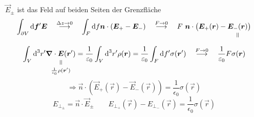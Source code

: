 $ \vec{E}_{\pm} $ ist das Feld auf beiden Seiten der Grenzfläche
\begin{equation*}
\int_{\partial V} \dd\vec{f}' \vec{E} \quad \buildrel \Delta z \to 0 \over \longrightarrow \quad \int_{F} \dd f \vec{n} \cdot (\vec{E}_+ - \vec{E}_-) \quad \buildrel F \to 0 \over \longrightarrow \quad F \ \vec{n} \cdot \big(\vec{E}_+(\vec{r}) - \equalto{\vec{E}_-(\vec{r})}{}\big)
\end{equation*}
\begin{equation*}
\int_V \dd^3r' \equalto{\vec{\nabla} \cdot \vec{E}(\vec{r}')}{\frac{1}{\epsilon_0} \rho(\vec{r}')} = \frac{1}{\epsilon_0} \int_V \dd^3r' \rho(\vec{r}) = \frac{1}{\epsilon_0} \int_F \dd f'  \sigma(\vec{r}') \quad \buildrel F \to 0 \over \longrightarrow \quad \frac{1}{\epsilon_0} F \sigma(\vec{r})
\end{equation*}
\begin{equation*}
\Rightarrow \vec{n} \cdot \left(\vec{E}_+(\vec{r}) - \vec{E}_-(\vec{r}) \right) = \frac{1}{\epsilon_0} \sigma(\vec{r})
\end{equation*}
\begin{equation*}
E_{\perp_\pm} = \vec{n} \cdot \vec{E}_{\pm} \qquad E_{\perp_+}(\vec{r}) - E_{\perp_-} (\vec{r}) = \frac{1}{\epsilon_0} \sigma(\vec{r})
\end{equation*}

